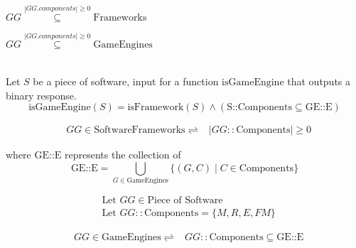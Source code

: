 \begin{math}
GG \overset{|GG.components| \geq 0}{\subseteq} \text{Frameworks} 
\end{math}

\begin{math}
GG \overset{|GG.components| \geq 0}{\subseteq} \text{GameEngines} 
\end{math}











\begin{equation}
\begin{align}

\label{}
\end{align}
\end{equation}

Let \( S \) be a piece of software, input for a function \( \text{isGameEngine} \) that outputs a binary response.
\[
\text{isGameEngine}(S) = \text{isFramework}(S) \land (\text{S::Components} \subseteq \text{GE::E})
\]


\begin{equation} \label{FrameworkDef}
\begin{align*} 
&GG \in \text{SoftwareFrameworks} 
\rightleftharpoons
&|GG::\text{Components}| \geq 0 
\end{align*}
\end{equation}


where \(\text{GE::E}\) represents the collection of \forall {} \forall {}
\]
\begin{equation} \label{gameEngineDef}
  \text{GE::E} = \bigcup_{G \in \text{GameEngines}} \{(G, C) \mid C \in \text{Components}\}
\end{equation}

\begin{equation} \label{myGameEngineDef}
\begin{align*} 
&\text{Let } GG \in \text{Piece of Software} \\
&\text{Let } GG::\text{Components} = \{M, R, E, FM\}
\end{align*}
\end{equation}


\begin{equation} \label{isGGaGE}
\begin{align*} 
&GG \in \text{GameEngines} 
\rightleftharpoons
&GG::\text{Components} \subseteq \text{GE::E}
\end{align*}
\end{equation}




